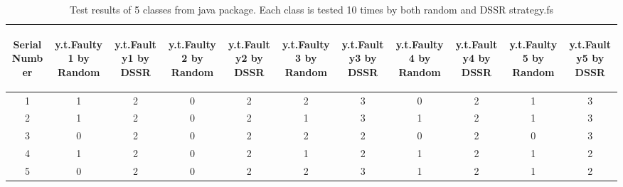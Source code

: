 \documentclass[10pt, conference, compsocconf]{IEEEtran}
\begin{document}
\begin{table}[ht]
\caption{Test results of 5 classes from java package. Each class is tested 10 times by both random and DSSR strategy.fs} %
\centering %
\begin{tabular}{| c | c | c | c | c | c | c | c | c | c | c |} %
\hline\hline %
 \begin{sideways} Serial Number \end{sideways} &  \begin{sideways} y.t.Faulty1 by Random \end{sideways} &  \begin{sideways} y.t.Faulty1 by DSSR \end{sideways} &  \begin{sideways} y.t.Faulty2 by Random \end{sideways} &  \begin{sideways} y.t.Faulty2 by DSSR \end{sideways} & \begin{sideways} y.t.Faulty3 by Random \end{sideways} &  \begin{sideways}y.t.Faulty3 by DSSR \end{sideways} &  \begin{sideways}y.t.Faulty4 by Random \end{sideways} &  \begin{sideways} y.t.Faulty4 by DSSR \end{sideways} &  \begin{sideways} y.t.Faulty5 by Random \end{sideways} &  \begin{sideways} y.t.Faulty5 by DSSR \end{sideways} \\ [1ex] %
\hline  %
1 & 1 & 2 & 0 & 2 & 2 & 3 & 0 & 2 & 1 & 3 \\  %

2 & 1 & 2 & 0 & 2 & 1 & 3 & 1 & 2 & 1 & 3 \\

3 & 0 & 2 & 0 & 2 & 2 & 2 & 0 & 2 & 0 & 3 \\

4 & 1 & 2 & 0 & 2 & 1 & 2 & 1 & 2 & 1 & 2 \\

5 & 0 & 2 & 0 & 2 & 2 & 3 & 1 & 2 & 1 & 2 \\


\end{tabular}
\end{table}
\end{document}

